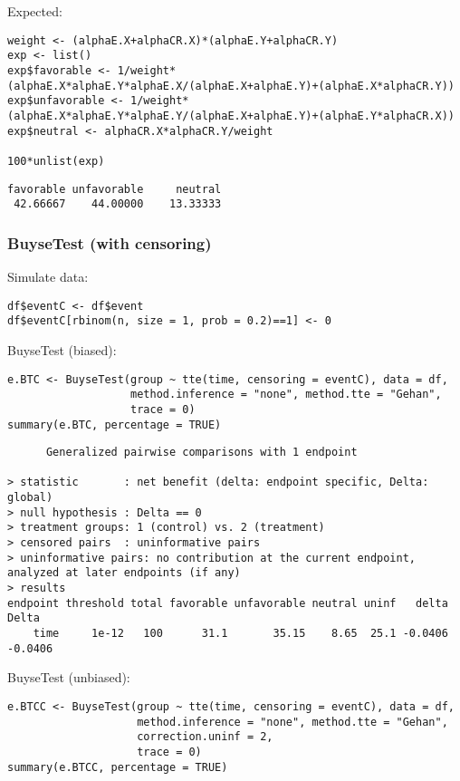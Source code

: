 \documentclass[12pt]{article}
\begin{document}
Expected:
\lstset{language=r,label= ,caption= ,captionpos=b,numbers=none}
\begin{lstlisting}
weight <- (alphaE.X+alphaCR.X)*(alphaE.Y+alphaCR.Y)
exp <- list()
exp$favorable <- 1/weight*(alphaE.X*alphaE.Y*alphaE.X/(alphaE.X+alphaE.Y)+(alphaE.X*alphaCR.Y))
exp$unfavorable <- 1/weight*(alphaE.X*alphaE.Y*alphaE.Y/(alphaE.X+alphaE.Y)+(alphaE.Y*alphaCR.X))
exp$neutral <- alphaCR.X*alphaCR.Y/weight

100*unlist(exp)
\end{lstlisting}

\begin{verbatim}
favorable unfavorable     neutral 
 42.66667    44.00000    13.33333
\end{verbatim}

\subsubsection{BuyseTest (with censoring)}
\label{sec:org2e98baf}

Simulate data:
\lstset{language=r,label= ,caption= ,captionpos=b,numbers=none}
\begin{lstlisting}
df$eventC <- df$event
df$eventC[rbinom(n, size = 1, prob = 0.2)==1] <- 0
\end{lstlisting}

BuyseTest (biased):
\lstset{language=r,label= ,caption= ,captionpos=b,numbers=none}
\begin{lstlisting}
e.BTC <- BuyseTest(group ~ tte(time, censoring = eventC), data = df,
				   method.inference = "none", method.tte = "Gehan",
				   trace = 0)
summary(e.BTC, percentage = TRUE)
\end{lstlisting}

\begin{verbatim}
      Generalized pairwise comparisons with 1 endpoint

> statistic       : net benefit (delta: endpoint specific, Delta: global) 
> null hypothesis : Delta == 0 
> treatment groups: 1 (control) vs. 2 (treatment) 
> censored pairs  : uninformative pairs
> uninformative pairs: no contribution at the current endpoint, analyzed at later endpoints (if any)
> results
endpoint threshold total favorable unfavorable neutral uninf   delta   Delta
    time     1e-12   100      31.1       35.15    8.65  25.1 -0.0406 -0.0406
\end{verbatim}

BuyseTest (unbiased):
\lstset{language=r,label= ,caption= ,captionpos=b,numbers=none}
\begin{lstlisting}
e.BTCC <- BuyseTest(group ~ tte(time, censoring = eventC), data = df,
					method.inference = "none", method.tte = "Gehan",
					correction.uninf = 2,
					trace = 0)
summary(e.BTCC, percentage = TRUE)
\end{lstlisting}
\end{document}
